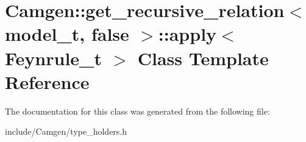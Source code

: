 \hypertarget{a00013}{\section{Camgen\-:\-:get\-\_\-recursive\-\_\-relation$<$ model\-\_\-t, false $>$\-:\-:apply$<$ Feynrule\-\_\-t $>$ Class Template Reference}
\label{a00013}
}


The documentation for this class was generated from the following file\-:\begin{DoxyCompactItemize}
\item 
include/\-Camgen/type\-\_\-holders.\-h\end{DoxyCompactItemize}

